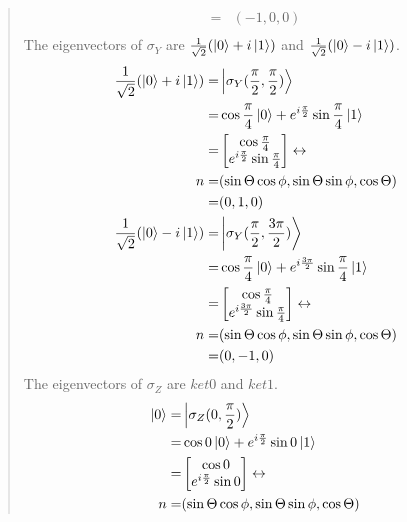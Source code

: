 \documentclass[UTF8]{ctexart}
\begin{document}
\begin{quote}
\begin{equation}
\begin{aligned}
		 =&(-1,0,0)\\
	\end{aligned}
\end{equation}
The eigenvectors of $\sigma_{Y}$ are $\frac{1}{\sqrt{2}}(\ket{0}+i\ket{1})$ and $\frac{1}{\sqrt{2}}(\ket{0}-i\ket{1})$.
\\
\begin{equation}
	\begin{aligned}
		\frac{1}{\sqrt{2}}(\ket{0}+i\ket{1})=&\ket{\sigma_{Y}(\frac{\pi}{2},\frac{\pi}{2})}\\
		=&\cos{\frac{\pi}{4}}\ket{0}+e^{i\frac{\pi}{2}}\sin{\frac{\pi}{4}}\ket{1}  \\
		=&\begin{bmatrix}
			\cos{\frac{\pi}{4}} \\ e^{i\frac{\pi}{2}}\sin{\frac{\pi}{4}}
		\end{bmatrix} \leftrightarrow \\
		n=&(\sin{\Theta}\cos{\phi},\sin{\Theta}\sin{\phi},\cos{\Theta})\\
		 =&(0,1,0)\\
		 \frac{1}{\sqrt{2}}(\ket{0}-i\ket{1})=&\ket{\sigma_{Y}(\frac{\pi}{2},\frac{3\pi}{2})}\\
		=&\cos{\frac{\pi}{4}}\ket{0}+e^{i\frac{3\pi}{2}}\sin{\frac{\pi}{4}}\ket{1}  \\
		=&\begin{bmatrix}
			\cos{\frac{\pi}{4}} \\ e^{i\frac{3\pi}{2}}\sin{\frac{\pi}{4}}
		\end{bmatrix} \leftrightarrow \\
		n=&(\sin{\Theta}\cos{\phi},\sin{\Theta}\sin{\phi},\cos{\Theta})\\
		 =&(0,-1,0)\\
	\end{aligned}
\end{equation}
The eigenvectors of $\sigma_{Z}$ are $ket{0}$ and $ket{1}$.
\\
\begin{equation}
	\begin{aligned}
		\ket{0}=&\ket{\sigma_{Z}(0,\frac{\pi}{2})}\\
		=&\cos{0}\ket{0}+e^{i\frac{\pi}{2}}\sin{0}\ket{1}  \\
		=&\begin{bmatrix}
			\cos{0} \\ e^{i\frac{\pi}{2}}\sin{0}
		\end{bmatrix} \leftrightarrow \\
		n=&(\sin{\Theta}\cos{\phi},\sin{\Theta}\sin{\phi},\cos{\Theta})\\

\end{aligned}
\end{equation}
\end{quote}
\end{document}
